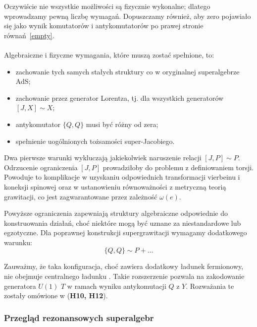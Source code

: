 \documentclass[12pt,a4paper]{article}
\begin{document}
Oczywiście nie wszystkie możliwości są fizycznie wykonalne; dlatego wprowadzamy pewną liczbę wymagań. Dopuszczamy również, aby zero pojawiało się jako wynik komutatorów i antykomutatorów po prawej stronie równań~\eqref{empty}.\\~~\\
%
Algebraiczne i fizyczne wymagania, które muszą zostać spełnione, to:
\begin{itemize}
	\item zachowanie tych samych stałych struktury co w oryginalnej superalgebrze AdS;
	\item zachowanie przez generator Lorentza, tj. dla wszystkich generatorów $[J, X]\sim X$;
	\item antykomutator $\{Q,Q\}$ musi być różny od zera;
	\item spełnienie uogólnionych tożsamości super-Jacobiego.
\end{itemize}
Dwa pierwsze warunki wykluczają jakiekolwiek naruszenie relacji $[J, P] \sim P$. 
Odrzucenie ograniczenia $[J, P]$ prowadziłoby do problemu z definiowaniem torsji. Powoduje to komplikacje w uzyskaniu odpowiednich transformacji vierbeinu i koneksji spinowej oraz w ustanowieniu równoważności z metryczną teorią grawitacji, co jest zagwarantowane przez zależność $\omega(e)$.

Powyższe ograniczenia zapewniają struktury algebraiczne odpowiednie do konstruowania działań, choć niektóre mogą być uznane za niestandardowe lub egzotyczne. Dla poprawnej konstrukcji supergrawitacji wymagamy dodatkowego warunku:
\begin{equation}
	\label{Eq_QQSugra}
	\{Q,Q\}\sim P+\dots
\end{equation}  

Zauważmy, że taka konfiguracja, choć zawiera dodatkowy ładunek fermionowy, nie obejmuje centralnego ładunku \cite{Gocanin:2019ota, Haag:1974qh}. Takie rozszerzenie pozwala na zakodowanie generatora $U(1)$ $T$ w ramach wyniku antykomutacji $Q$ z $Y$. Rozważania te zostały omówione w (\textbf{H10, H12}).

\subsubsection{Przegląd rezonansowych superalgebr}\label{Overview}
\end{document}
